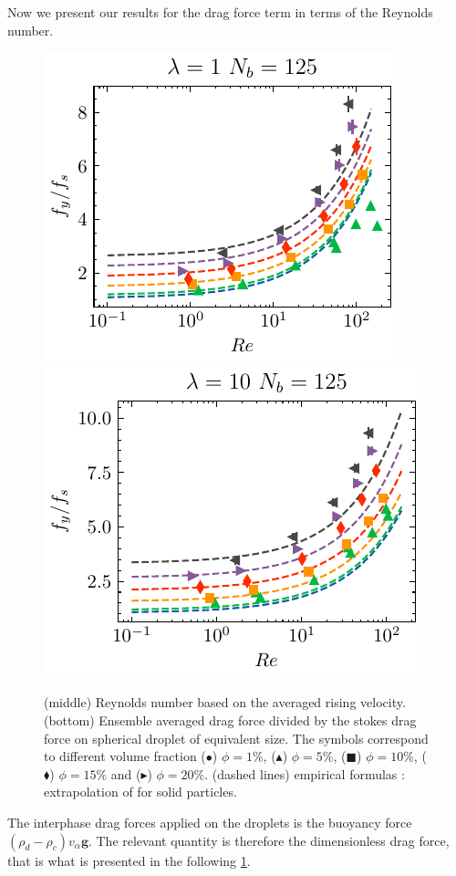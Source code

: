 



Now we present our results for the drag force term in terms of the Reynolds number. 
\begin{figure}[h!]
    \centering
    \includegraphics[height = 0.35\textwidth]{image/HOMOGENEOUS/fCA/Fstokes_N_5_l_1.pdf}
    \includegraphics[height = 0.35\textwidth]{image/HOMOGENEOUS/fCA/Fstokes_N_5_l_10.pdf}
    \caption{
        (middle) Reynolds number based on the averaged rising velocity.
    (bottom) Ensemble averaged drag force divided by the stokes drag force on spherical droplet of equivalent size.
    The symbols correspond to different volume fraction ($\bullet$) $\phi = 1\%$, ($\blacktriangle$) $\phi = 5\%$, ($\blacksquare$) $\phi = 10\%$, ($\blacklozenge$) $\phi = 15\%$ and ($\blacktriangleright$) $\phi = 20\%$.
    (dashed lines) empirical formulas : extrapolation of  \citet{tenneti2011drag} for solid particles. }
    \label{fig:drag_force}
\end{figure}

The interphase drag forces applied on the droplets is the buoyancy force $(\rho_d-\rho_c)v_\alpha \textbf{g}$.
The relevant quantity is therefore the dimensionless drag force, that is what is presented in the following \ref{fig:drag_force}. 


